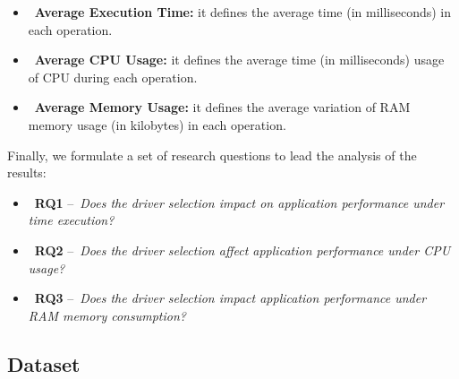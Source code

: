 \documentclass{svproc}
\begin{document}


\begin{itemize}
\item~\textbf{Average Execution Time:} it defines the average time (in milliseconds) in each operation.
\item~\textbf{Average CPU Usage:} it defines the average time (in milliseconds) usage of CPU during each operation.
\item~\textbf{Average Memory Usage:} it defines the average variation of RAM memory usage (in kilobytes) in each operation.
\end{itemize}

Finally, we formulate a set of research questions to lead the analysis of the results:

\begin{itemize}
\item~\textbf{RQ1} --~\emph{Does the driver selection impact on application performance under time execution?}
\item~\textbf{RQ2} --~\emph{Does the driver selection affect application performance under CPU usage?}
\item~\textbf{RQ3} --~\emph{Does the driver selection impact application performance under RAM memory consumption?}
\end{itemize}

\subsection{Dataset}


\end{document}
